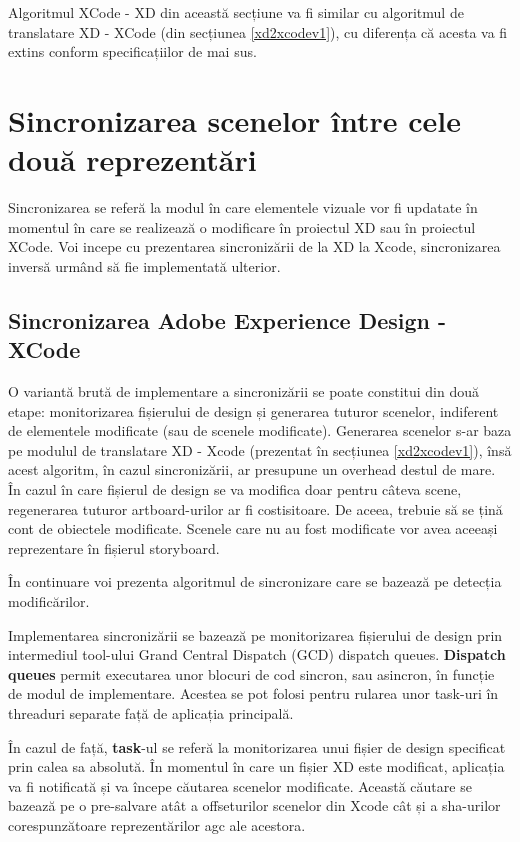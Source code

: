 Algoritmul XCode - XD din această secțiune va fi similar cu algoritmul de translatare XD - XCode (din secțiunea \ref{xd2xcodev1}), cu diferența că acesta va fi extins conform specificațiilor de mai sus.

\section{Sincronizarea scenelor între cele două reprezentări} \label{syncme}

Sincronizarea se referă la modul în care elementele vizuale vor fi updatate în momentul în care se realizează o modificare în proiectul XD sau în proiectul XCode.
Voi incepe cu prezentarea sincronizării de la XD la Xcode, sincronizarea inversă urmând să fie implementată ulterior.

\subsection{Sincronizarea Adobe Experience Design - XCode}

O variantă brută de implementare a sincronizării se poate constitui din două etape: monitorizarea fișierului de design și generarea tuturor scenelor, indiferent de elementele modificate (sau de scenele modificate). Generarea scenelor s-ar baza pe modulul de translatare XD - Xcode (prezentat în secțiunea \ref{xd2xcodev1}), însă acest algoritm, în cazul sincronizării, ar presupune un overhead destul de mare. În cazul în care fișierul de design se va modifica doar pentru câteva scene, regenerarea tuturor artboard-urilor ar fi costisitoare. De aceea, trebuie să se țină cont de obiectele modificate. Scenele care nu au fost modificate vor avea aceeași reprezentare în fișierul storyboard.

În continuare voi prezenta algoritmul de sincronizare care se bazează pe detecția modificărilor.

Implementarea sincronizării se bazează pe monitorizarea fișierului de design prin intermediul tool-ului Grand Central Dispatch (GCD) dispatch queues. \textbf{Dispatch queues} permit executarea unor blocuri de cod sincron, sau asincron, în funcție de modul de implementare. Acestea se pot folosi pentru rularea unor task-uri în threaduri separate față de aplicația principală. 

În cazul de față, \textbf{task}-ul se referă la monitorizarea unui fișier de design specificat prin calea sa absolută. În momentul în care un fișier XD este modificat, aplicația va fi notificată și va începe căutarea scenelor modificate. 
Această căutare se bazează pe o pre-salvare atât a offseturilor scenelor din Xcode cât și a sha-urilor corespunzătoare reprezentărilor agc ale acestora. 


